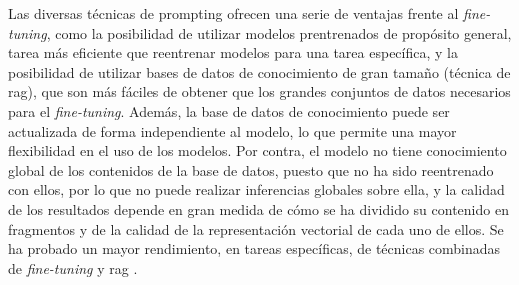 Las diversas técnicas de {prompting} ofrecen una serie de ventajas frente al \emph{fine-tuning}, como la posibilidad de utilizar modelos prentrenados de propósito general, tarea más eficiente que reentrenar modelos para una tarea específica, y la posibilidad de utilizar bases de datos de conocimiento de gran tamaño (técnica de \gls{rag}), que son más fáciles de obtener que los grandes conjuntos de datos necesarios para el \emph{fine-tuning}. Además, la base de datos de conocimiento puede ser actualizada de forma independiente al modelo, lo que permite una mayor flexibilidad en el uso de los modelos. Por contra, el modelo  no tiene conocimiento global de los contenidos de la base de datos, puesto que no ha sido reentrenado con ellos, por lo que no puede realizar inferencias globales sobre ella, y la calidad de los resultados depende en gran medida de cómo se ha dividido su contenido en fragmentos y de la calidad de la representación vectorial de cada uno de ellos. Se ha probado un mayor rendimiento, en tareas específicas, de técnicas combinadas de \emph{fine-tuning} y \gls{rag} \citep{lewisRetrievalAugmentedGenerationKnowledgeIntensive2021}.





